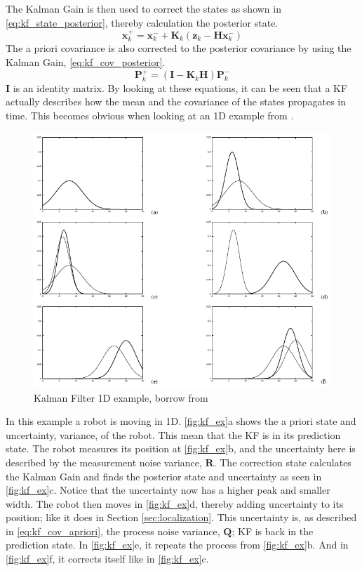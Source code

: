 \documentclass[Main]{subfiles}
\begin{document}
The Kalman Gain is then used to correct the states as shown in \autoref{eq:kf_state_posterior}, thereby calculation the posterior state. 
\begin{equation}
\label{eq:kf_state_posterior}
\mathbf{x}_k^+ = \mathbf{x}_k^- + \mathbf{K}_k (\mathbf{z}_k - \mathbf{H} \mathbf{x}_k^-)
\end{equation}
The a priori covariance is also corrected to the posterior covariance by using the Kalman Gain, \autoref{eq:kf_cov_posterior}.
\begin{equation}
\label{eq:kf_cov_posterior}
\mathbf{P}_k^+ = (\mathbf{I} - \mathbf{K}_k \mathbf{H}) \mathbf{P}_k^-
\end{equation}
$\mathbf{I}$ is an identity matrix.
By looking at these equations, it can be seen that a KF actually describes how the mean and the covariance of the states propagates in time.
This becomes obvious when looking at an 1D example from \citep{Thrun2002}.
\begin{figure}[H]
	\centering
	\includegraphics[width=0.8\linewidth]{./Figures/kf_ex.png}
	\caption{Kalman Filter 1D example, borrow from \citep{Thrun2002}}
	\label{fig:kf_ex}
\end{figure}\noindent
In this example a robot is moving in 1D.
\autoref{fig:kf_ex}a shows the a priori state and uncertainty, variance, of the robot.
This mean that the KF is in its prediction state.
The robot measures its position at \autoref{fig:kf_ex}b, and the uncertainty here is described by the measurement noise variance, $\mathbf{R}$.
The correction state calculates the Kalman Gain and finds the posterior state and uncertainty as seen in \autoref{fig:kf_ex}c.
Notice that the uncertainty now has a higher peak and smaller width.
The robot then moves in \autoref{fig:kf_ex}d, thereby adding uncertainty to its position; like it does in Section \ref{sec:localization}.
This uncertainty is, as described in \autoref{eq:kf_cov_apriori}, the process noise variance, $\mathbf{Q}$; KF is back in the prediction state.
In \autoref{fig:kf_ex}e, it repeats the process from \autoref{fig:kf_ex}b.
And in \autoref{fig:kf_ex}f, it corrects itself like in \autoref{fig:kf_ex}c.
\end{document}
